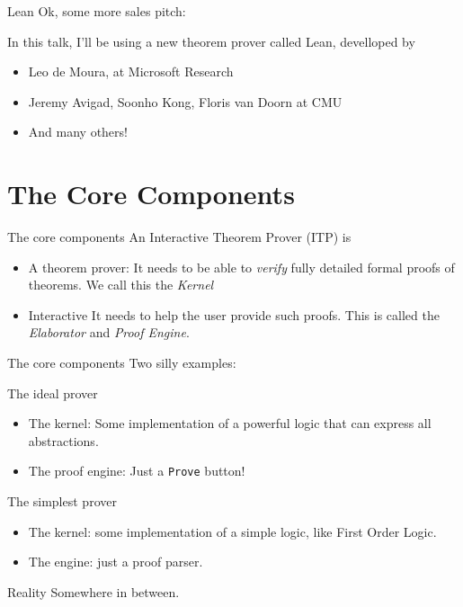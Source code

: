 \documentclass{beamer}
\begin{document}
\begin{frame}{Lean}
  Ok, some more sales pitch:\bigskip

  In this talk, I'll be using a new theorem prover called Lean, develloped by
  \begin{itemize}
  \item Leo de Moura, at Microsoft Research
  \item Jeremy Avigad, Soonho Kong, Floris van Doorn at CMU
  \item And many others!
  \end{itemize}
\end{frame}
  
\section{The Core Components}

\begin{frame}{The core components}
  An Interactive Theorem Prover (ITP) is
  \begin{itemize}
  \item
    \begin{block}{A theorem prover:}
      It needs to be able to \emph{verify} fully detailed formal
      proofs of theorems. We call this the \emph{Kernel}
    \end{block}
  \item
    \begin{block}{Interactive}
      It needs to help the user provide such proofs. This is called
      the \emph{Elaborator} and \emph{Proof Engine}.
    \end{block}
  \end{itemize}
\end{frame}

\begin{frame}{The core components}
  Two silly examples:
  \begin{block}{The ideal prover}
    \begin{itemize}
    \item The kernel: Some implementation of a powerful logic that can express all abstractions.
    \item The proof engine: Just a \texttt{Prove} button!
    \end{itemize}
  \end{block}
  \begin{block}{The simplest prover}
    \begin{itemize}
    \item The kernel: some implementation of a simple logic, like First Order Logic.
    \item The engine: just a proof parser.
    \end{itemize}
  \end{block}
  \begin{block}{Reality}
    Somewhere in between.
  \end{block}
\end{frame}
\end{document}
